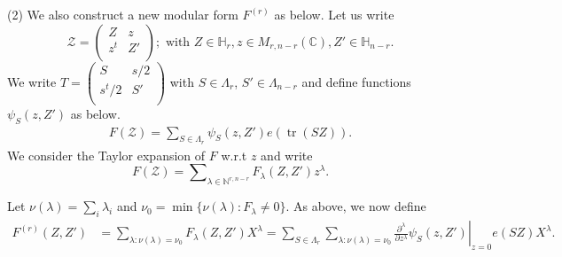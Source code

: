 \documentclass[11pt]{amsart}
\numberwithin{equation}{section}
\newcommand{\mbb}{\mathbb}
\newcommand{\mc}{\mathcal}
\newcommand{\smat}[4]{\left( \begin{smallmatrix} #1 & #2 \\ #3 & #4 \\ \end{smallmatrix} \right)}
\DeclareMathOperator{\tr}{tr}
\newcommand{\sumn}{\sum \nolimits}
\begin{document}
(2) We also construct a new modular form $F^{(r)}$ as below. Let us write
\begin{equation}
    \mc Z=\smat{Z}{ z}{z^t}{Z'}; \text{ with } Z\in \mbb H_r, z\in M_{r,n-r}(\mbb C), Z'\in \mbb H_{n-r}.
\end{equation}
We write $T= \smat{S}{s/2}{s^t/2}{S'}$ with $S\in \Lambda_r$, $S'\in \Lambda_{n-r}$ and define functions $\psi_S(z, Z')$ as below.
\begin{align}
    F(\mc Z)= \sumn_{S\in \Lambda_{r}}\psi_S(z, Z')e(\tr(SZ)).
\end{align}
We consider the Taylor expansion of $F$ w.r.t $z$ and write
\begin{equation}
    F(\mc Z)= \sumn_{\lambda\in \mbb N^{r,n-r}} F_{\lambda}(Z, Z') z^\lambda.
\end{equation}

Let $\nu(\lambda)=\sum_i \lambda_i$ and $\nu_0=\min \{\nu(\lambda): F_\lambda\neq 0\}$. As above, we now define
\begin{align}
   F^{(r)}(Z, Z')&= \sum_{\lambda: \nu(\lambda)=\nu_0} F_{\lambda}(Z, Z') X^\lambda= \sum_{S\in \Lambda_{r}} \sum_{\lambda: \nu(\lambda)=\nu_0} \left.\frac{\partial^\lambda}{\partial z^\lambda}\psi_S(z, Z')\right |_{z=0} e(SZ) X^\lambda.
\end{align}
\end{document}

